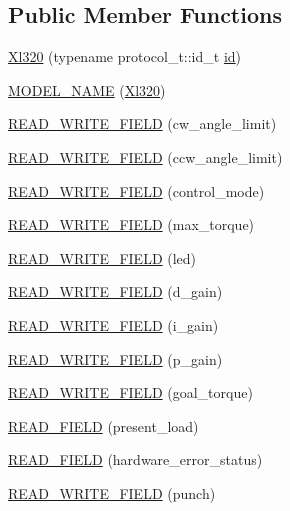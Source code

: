 \subsection*{Public Member Functions}
\begin{DoxyCompactItemize}
\item 
\hyperlink{classdynamixel_1_1servos_1_1_xl320_aed4a5f824f79553734f961190da8c4ef}{Xl320} (typename protocol\+\_\+t\+::id\+\_\+t \hyperlink{classdynamixel_1_1servos_1_1_servo_a2d022081672e25a7bb57b76706e1cc57}{id})
\item 
\hyperlink{classdynamixel_1_1servos_1_1_xl320_a5fc3d58cf15be05cb76bfc9a6de213b7}{M\+O\+D\+E\+L\+\_\+\+N\+A\+M\+E} (\hyperlink{classdynamixel_1_1servos_1_1_xl320}{Xl320})
\item 
\hyperlink{classdynamixel_1_1servos_1_1_xl320_a65c59a74ce3a8f8371b1961d36a4efb8}{R\+E\+A\+D\+\_\+\+W\+R\+I\+T\+E\+\_\+\+F\+I\+E\+L\+D} (cw\+\_\+angle\+\_\+limit)
\item 
\hyperlink{classdynamixel_1_1servos_1_1_xl320_a0f71945ee31bd8bc839fa7ffe8276dbe}{R\+E\+A\+D\+\_\+\+W\+R\+I\+T\+E\+\_\+\+F\+I\+E\+L\+D} (ccw\+\_\+angle\+\_\+limit)
\item 
\hyperlink{classdynamixel_1_1servos_1_1_xl320_af2869bfbfad26138c4f105ce13af20e0}{R\+E\+A\+D\+\_\+\+W\+R\+I\+T\+E\+\_\+\+F\+I\+E\+L\+D} (control\+\_\+mode)
\item 
\hyperlink{classdynamixel_1_1servos_1_1_xl320_a4631cc8b5dcb7f379d73208a1ff333e7}{R\+E\+A\+D\+\_\+\+W\+R\+I\+T\+E\+\_\+\+F\+I\+E\+L\+D} (max\+\_\+torque)
\item 
\hyperlink{classdynamixel_1_1servos_1_1_xl320_a29edd31754c9d5e907cc970e69ab0e49}{R\+E\+A\+D\+\_\+\+W\+R\+I\+T\+E\+\_\+\+F\+I\+E\+L\+D} (led)
\item 
\hyperlink{classdynamixel_1_1servos_1_1_xl320_a1f26c93c37f80f3aca9b03447750f24d}{R\+E\+A\+D\+\_\+\+W\+R\+I\+T\+E\+\_\+\+F\+I\+E\+L\+D} (d\+\_\+gain)
\item 
\hyperlink{classdynamixel_1_1servos_1_1_xl320_a2a6ceb05caf8844bcb268ed4966811cb}{R\+E\+A\+D\+\_\+\+W\+R\+I\+T\+E\+\_\+\+F\+I\+E\+L\+D} (i\+\_\+gain)
\item 
\hyperlink{classdynamixel_1_1servos_1_1_xl320_a8a084c05e6da3f600a2911667cc45516}{R\+E\+A\+D\+\_\+\+W\+R\+I\+T\+E\+\_\+\+F\+I\+E\+L\+D} (p\+\_\+gain)
\item 
\hyperlink{classdynamixel_1_1servos_1_1_xl320_a8fd338fa56bc4574ba9bb1a95518e6b0}{R\+E\+A\+D\+\_\+\+W\+R\+I\+T\+E\+\_\+\+F\+I\+E\+L\+D} (goal\+\_\+torque)
\item 
\hyperlink{classdynamixel_1_1servos_1_1_xl320_aa2fd6f7c894b40f2afbe8d3705f5b840}{R\+E\+A\+D\+\_\+\+F\+I\+E\+L\+D} (present\+\_\+load)
\item 
\hyperlink{classdynamixel_1_1servos_1_1_xl320_a5f2bac4373d63023fb339aaeb098ac54}{R\+E\+A\+D\+\_\+\+F\+I\+E\+L\+D} (hardware\+\_\+error\+\_\+status)
\item 
\hyperlink{classdynamixel_1_1servos_1_1_xl320_aec1bb28ccb7a84abc644903314e898d9}{R\+E\+A\+D\+\_\+\+W\+R\+I\+T\+E\+\_\+\+F\+I\+E\+L\+D} (punch)
\end{DoxyCompactItemize}
